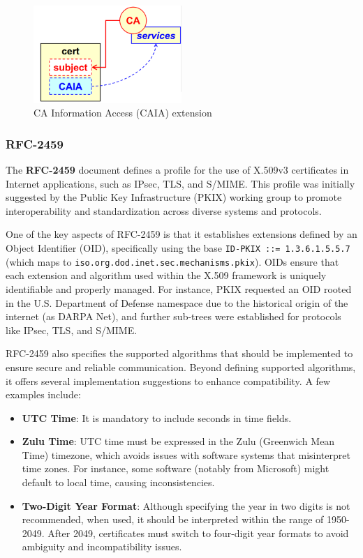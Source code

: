 \begin{figure}[h]
  \centering
  \includegraphics[width=0.5\textwidth]{img/x509 CAIA.png}

  \caption{CA Information Access (CAIA) extension}
\end{figure}

\subsubsection{RFC-2459}

The \textbf{RFC-2459} document defines a profile for the use of 
X.509v3 certificates in Internet applications, such as IPsec, TLS, 
and S/MIME. This profile was initially suggested by the Public Key 
Infrastructure (PKIX) working group to promote interoperability 
and standardization across diverse systems and protocols.

One of the key aspects of RFC-2459 is that it establishes extensions 
defined by an Object Identifier (OID), specifically using the base 
\texttt{ID-PKIX ::= 1.3.6.1.5.5.7} (which maps to 
\texttt{iso.org.dod.inet.sec.mechanisms.pkix}). OIDs ensure that 
each extension and algorithm used within the X.509 framework is 
uniquely identifiable and properly managed. For instance, PKIX 
requested an OID rooted in the U.S. Department of Defense namespace 
due to the historical origin of the internet (as DARPA Net), and 
further sub-trees were established for protocols like IPsec, TLS, 
and S/MIME.

RFC-2459 also specifies the supported algorithms that should be 
implemented to ensure secure and reliable communication. Beyond 
defining supported algorithms, it offers several implementation 
suggestions to enhance compatibility. A few examples include:
\begin{itemize}
    \item \textbf{UTC Time}: It is mandatory to include seconds 
    in time fields.
    \item \textbf{Zulu Time}: UTC time must be expressed in the 
    Zulu (Greenwich Mean Time) timezone, which avoids issues with 
    software systems that misinterpret time zones. For instance, 
    some software (notably from Microsoft) might default to local 
    time, causing inconsistencies.
    \item \textbf{Two-Digit Year Format}: Although specifying the 
    year in two digits is not recommended, when used, it should be 
    interpreted within the range of 1950-2049. After 2049, 
    certificates must switch to four-digit year formats to avoid 
    ambiguity and incompatibility issues.
\end{itemize}

